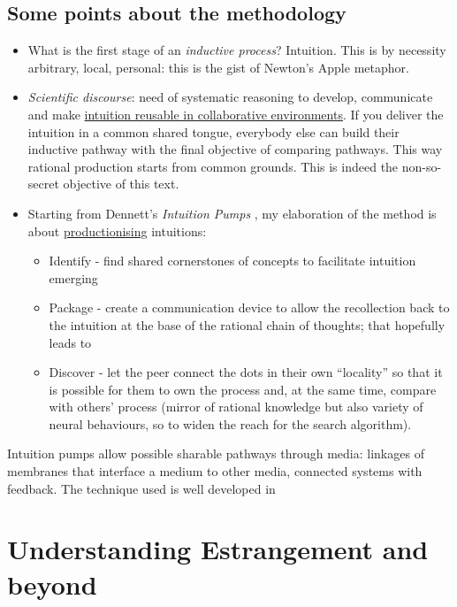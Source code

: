 \documentclass[14pt]{extarticle}
\begin{document}
\subsection*{Some points about the methodology}
\label{subsec:methodology}
\begin{itemize}
\item What is the first stage of an \textit{inductive process}? Intuition. This is by necessity arbitrary, local, personal: this is the gist of Newton’s Apple metaphor.
\item \textit{Scientific discourse}: need of systematic reasoning to develop, communicate and make \underline{intuition reusable in collaborative environments}. If you deliver the intuition in a common shared tongue, everybody else can build their inductive pathway with the final objective of comparing pathways. This way rational production starts from common grounds. This is indeed the non-so-secret objective of this text.
\item Starting from Dennett’s \textit{Intuition Pumps} \cite{dennett2014intuition}, my elaboration of the method is about \underline{productionising} intuitions:
	\begin{itemize}
\item Identify - find shared cornerstones of concepts to facilitate intuition emerging
\item Package - create a communication device to allow the recollection back to the intuition at the base of the rational chain of thoughts; that hopefully leads to
\item Discover - let the peer connect the dots in their own “locality” so that it is possible for them to own the process and, at the same time, compare with others’ process (mirror of rational knowledge but also variety of neural behaviours, so to widen the reach for the search algorithm).
	\end{itemize}
\end{itemize}
\hspace*{15mm}Intuition pumps allow possible sharable pathways through media: linkages of membranes that interface a medium to other media, connected systems with feedback. The technique used is well developed in \cite{dennett2017bacteria,dennett2008kinds}

\section*{Understanding Estrangement and beyond}
\label{subsec:enstrangement}
\end{document}
